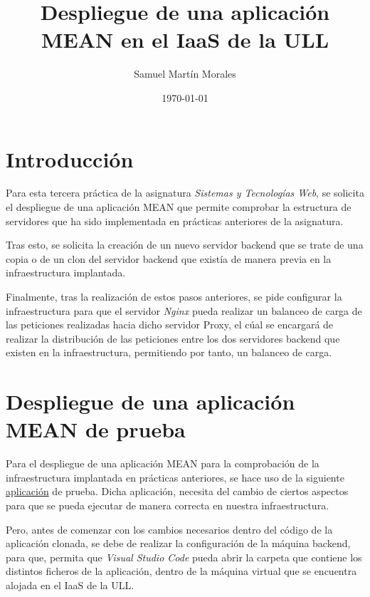 \documentclass{report}
\begin{document}
	
	
	\title{Despliegue de una aplicación MEAN en el IaaS de la ULL}
	\author{Samuel Martín Morales}
	\date{\today}
	
	\maketitle
	
	\tableofcontents
	
	\chapter{Introducción}
  Para esta tercera práctica de la asignatura \emph{Sistemas y Tecnologías Web}, se solicita el despliegue de una aplicación MEAN que permite comprobar la estructura de servidores que ha sido implementada en prácticas anteriores de la asignatura. 
  
  Tras esto, se solicita la creación de un nuevo servidor backend que se trate de una copia o de un clon del servidor backend que existía de manera previa en la infraestructura implantada. 
  
  Finalmente, tras la realización de estos pasos anteriores, se pide configurar la infraestructura para que el servidor \emph{Nginx} pueda realizar un balanceo de carga de las peticiones realizadas hacia dicho servidor Proxy, el cúal se encargará de realizar la distribución de las peticiones entre los dos servidores backend que existen en la infraestructura, permitiendo por tanto, un balanceo de carga.
	
	\chapter{Despliegue de una aplicación MEAN de prueba}
	Para el despliegue de una aplicación MEAN para la comprobación de la infraestructura implantada en prácticas anteriores, se hace uso de la siguiente \href{https://github.com/mongodb-developer/mean-stack-example}{aplicación} de prueba. Dicha aplicación, necesita del cambio de ciertos aspectos para que se pueda ejecutar de manera correcta en nuestra infraestructura.

  Pero, antes de comenzar con los cambios necesarios dentro del código de la aplicación clonada, se debe de realizar la configuración de la máquina backend, para que, permita que \emph{Visual Studio Code} pueda abrir la carpeta que contiene los distintos ficheros de la aplicación, dentro de la máquina virtual que se encuentra alojada en el IaaS de la ULL. 
  
\end{document}
